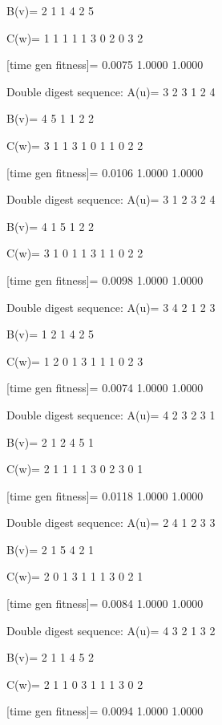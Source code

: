B(v)=
     2     1     1     4     2     5

C(w)=
     1     1     1     1     1     3     0     2     0     3     2

[time gen fitness]=
    0.0075    1.0000    1.0000

Double digest sequence:
A(u)=
     3     2     3     1     2     4

B(v)=
     4     5     1     1     2     2

C(w)=
     3     1     1     3     1     0     1     1     0     2     2

[time gen fitness]=
    0.0106    1.0000    1.0000

Double digest sequence:
A(u)=
     3     1     2     3     2     4

B(v)=
     4     1     5     1     2     2

C(w)=
     3     1     0     1     1     3     1     1     0     2     2

[time gen fitness]=
    0.0098    1.0000    1.0000

Double digest sequence:
A(u)=
     3     4     2     1     2     3

B(v)=
     1     2     1     4     2     5

C(w)=
     1     2     0     1     3     1     1     1     0     2     3

[time gen fitness]=
    0.0074    1.0000    1.0000

Double digest sequence:
A(u)=
     4     2     3     2     3     1

B(v)=
     2     1     2     4     5     1

C(w)=
     2     1     1     1     1     3     0     2     3     0     1

[time gen fitness]=
    0.0118    1.0000    1.0000

Double digest sequence:
A(u)=
     2     4     1     2     3     3

B(v)=
     2     1     5     4     2     1

C(w)=
     2     0     1     3     1     1     1     3     0     2     1

[time gen fitness]=
    0.0084    1.0000    1.0000

Double digest sequence:
A(u)=
     4     3     2     1     3     2

B(v)=
     2     1     1     4     5     2

C(w)=
     2     1     1     0     3     1     1     1     3     0     2

[time gen fitness]=
    0.0094    1.0000    1.0000


